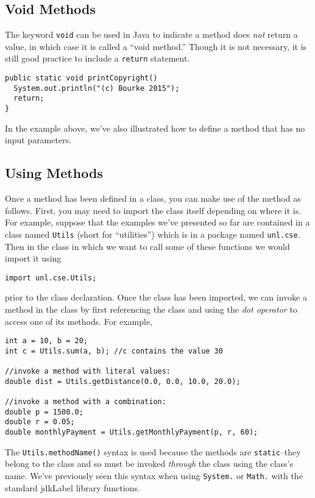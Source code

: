 \subsection{Void Methods}

The keyword \texttt{void} can be used in Java to indicate
a method does \emph{not} return a value, in which case it is
called a ``void method.''  Though it is not necessary, it is still
good practice to include a \texttt{return} statement.

\begin{verbatim}
public static void printCopyright()
  System.out.println("(c) Bourke 2015");
  return;
}
\end{verbatim}

In the example above, we've also illustrated how to define a 
method that has no input parameters.  

\subsection{Using Methods}

Once a method has been defined in a class, you can make
use of the method as follows.  First, you may need to import
the class itself depending on where it is.  For example, suppose
that the examples we've presented so far are contained in a 
class named \texttt{Utils} (short for ``utilities'') which 
is in a package named \texttt{unl.cse}.  Then in the 
class in which we want to call some of these functions we would
import it using 

\texttt{import unl.cse.Utils;}

prior to the class declaration.  Once the class has been imported, 
we can invoke a method in the class by first referencing the class
and using the \emph{dot operator} to access one of its methods.
For example, 

\begin{verbatim}
int a = 10, b = 20;
int c = Utils.sum(a, b); //c contains the value 30

//invoke a method with literal values:
double dist = Utils.getDistance(0.0, 0.0, 10.0, 20.0);

//invoke a method with a combination:
double p = 1500.0;
double r = 0.05;
double monthlyPayment = Utils.getMonthlyPayment(p, r, 60);
\end{verbatim}

The \texttt{Utils.methodName()} syntax is used because
the methods are \texttt{static}--they belong to the class
and so must be invoked \emph{through} the class using the
class's name.  We've previously seen this syntax when using
\texttt{System.} or \texttt{Math.} with the
standard \gls{jdkLabel} library functions.

